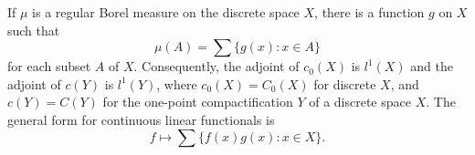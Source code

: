 If $\mu$ is a regular Borel measure on the discrete space $X$, there is a function $g$ on $X$ such that
$$\mu(A) = \sum \{g(x): x \in A\}$$
for each subset $A$ of $X$. Consequently, the adjoint of $c_0(X)$ is $l^1(X)$ and the adjoint of $c(Y)$ is $l^1(Y)$, where $c_0(X) = C_0(X)$ for discrete $X$, and $c(Y) = C(Y)$ for the one-point compactification $Y$ of a discrete space $X$. The general form for continuous linear functionals is
$$f \mapsto \sum \{f(x) g(x): x \in X\}.$$

